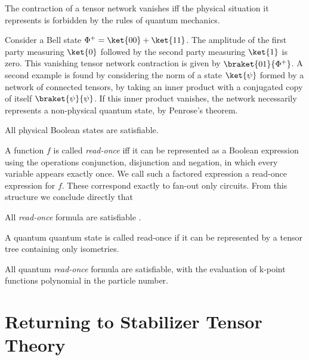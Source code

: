 \begin{corollary}
 The contraction of a tensor network vanishes iff the physical situation it represents is forbidden by the rules of quantum mechanics.  
\end{corollary}


\begin{example}
 Consider a Bell state $\Phi^+ = \ket{00}+\ket{11}$.  The amplitude of the first party measuring $\ket{0}$ followed by the second party measuring $\ket{1}$ is zero. This vanishing tensor network contraction is given by $\braket{01}{\Phi^+}$.  A second example is found by considering the norm of a state $\ket{\psi}$ formed by a network of connected tensors, by taking an inner product with a conjugated copy of itself $\braket{\psi}{\psi}$.  If this inner product vanishes, the network necessarily represents a non-physical quantum state, by Penrose's theorem. 
\end{example}

\begin{corollary}
All physical Boolean states are satisfiable.  
\end{corollary}


\begin{remark}
A function $f$ is called \textit{read-once} iff it can be represented
as a Boolean expression using the operations conjunction, disjunction and negation, in
which every variable appears exactly once. We call such a factored expression a read-once
expression for $f$.  These correspond exactly to fan-out only circuits.  From this structure we conclude directly that  
\end{remark}

\begin{corollary}
All \textit{read-once} formula are satisfiable \cite{2015JSP...160.1389B}.  
\end{corollary}

\begin{remark}
A quantum quantum state is called read-once if it can be represented by a tensor tree containing only isometries.   
\end{remark}

\begin{corollary}
All quantum \textit{read-once} formula are satisfiable, with the evaluation of k-point functions polynomial in the particle number.  
\end{corollary}


\section{Returning to Stabilizer Tensor Theory} 

